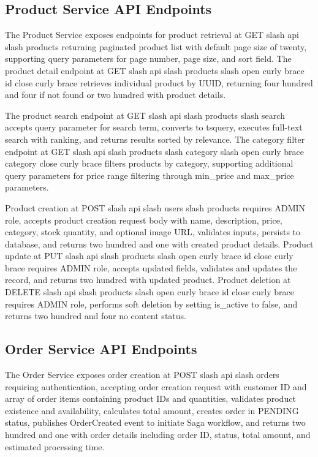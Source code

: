 \subsection{Product Service API Endpoints}

The Product Service exposes endpoints for product retrieval at GET slash api slash products returning paginated product list with default page size of twenty, supporting query parameters for page number, page size, and sort field. The product detail endpoint at GET slash api slash products slash open curly brace id close curly brace retrieves individual product by UUID, returning four hundred and four if not found or two hundred with product details.

The product search endpoint at GET slash api slash products slash search accepts query parameter for search term, converts to tsquery, executes full-text search with ranking, and returns results sorted by relevance. The category filter endpoint at GET slash api slash products slash category slash open curly brace category close curly brace filters products by category, supporting additional query parameters for price range filtering through min\_price and max\_price parameters.

Product creation at POST slash api slash users slash products requires ADMIN role, accepts product creation request body with name, description, price, category, stock quantity, and optional image URL, validates inputs, persists to database, and returns two hundred and one with created product details. Product update at PUT slash api slash products slash open curly brace id close curly brace requires ADMIN role, accepts updated fields, validates and updates the record, and returns two hundred with updated product. Product deletion at DELETE slash api slash products slash open curly brace id close curly brace requires ADMIN role, performs soft deletion by setting is\_active to false, and returns two hundred and four no content status.

\subsection{Order Service API Endpoints}

The Order Service exposes order creation at POST slash api slash orders requiring authentication, accepting order creation request with customer ID and array of order items containing product IDs and quantities, validates product existence and availability, calculates total amount, creates order in PENDING status, publishes OrderCreated event to initiate Saga workflow, and returns two hundred and one with order details including order ID, status, total amount, and estimated processing time.

